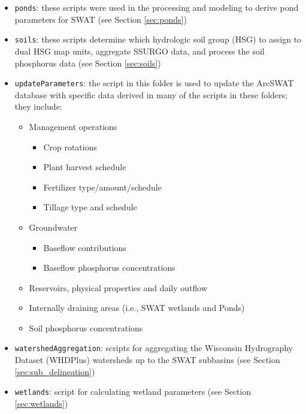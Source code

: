 \begin{itemize}
\item \texttt{ponds}: these scripts were used in the processing and modeling to derive pond parameters for SWAT (see Section \ref{sec:ponds})

\item \texttt{soils}: these scripts  determine which hydrologic soil group (HSG) to assign to dual HSG map units, aggregate SSURGO data, and process the soil phosphorus data  (see Section \ref{sec:soils})

\item \texttt{updateParameters}: the script in this folder is used to update the ArcSWAT database with specific data derived in many of the scripts in these folders; they include:
	\begin{itemize}
	\item Management operations
		\begin{itemize}
		\item Crop rotations
		\item Plant harvest schedule
		\item Fertilizer type/amount/schedule
		\item Tillage type and schedule
		\end{itemize}
	\item Groundwater
		\begin{itemize}
		\item Baseflow contributions
		\item Baseflow phosphorus concentrations 
		\end{itemize}
	\item Reservoirs, physical properties and daily outflow
	\item Internally draining areas (i.e., SWAT wetlands and Ponds)
	\item Soil phosphorus concentrations	
	\end{itemize} 

\item \texttt{watershedAggregation}: scripts for aggregating the Wisconsin Hydrography Dataset (WHDPlus) watersheds up to the SWAT subbasins (see Section \ref{sec:sub_delineation})

\item \texttt{wetlands}: script for calculating wetland parameters  (see Section \ref{sec:wetlands})

\end{itemize}
